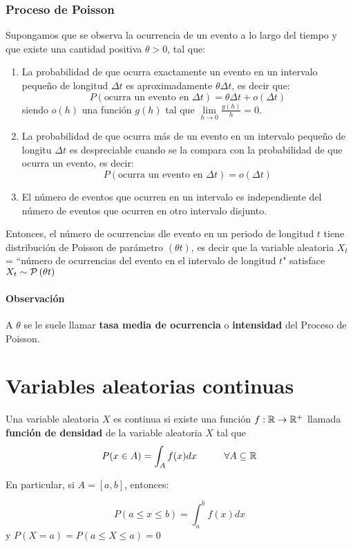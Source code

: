 \subsubsection{Proceso de Poisson}
Supongamos que se observa la ocurrencia de un evento a lo largo del tiempo y que existe una cantidad positiva $\theta > 0$, tal que:
\begin{enumerate}
\item La probabilidad de que ocurra exactamente un evento en un intervalo pequeño de longitud $\Delta t$ es aproximadamente $\theta\Delta t$, es decir que:
$$P(\text{ocurra un evento en }\Delta t) = \theta\Delta t + o(\Delta t)$$
siendo $o(h)$ una función $g(h)$ tal que $\lim\limits_{h\to 0}\frac{g(h)}{h} = 0$.
\item La probabilidad de que ocurra más de un evento en un intervalo pequeño de longitu $\Delta t$ es despreciable cuando se la compara con la probabilidad de que ocurra un evento, es decir:
$$P(\text{ocurra un evento en }\Delta t) =  o(\Delta t)$$
\item El número de eventos que ocurren en un intervalo es independiente del número de eventos que ocurren en otro intervalo disjunto.
\end{enumerate}

Entonces, el número de ocurrencias dle evento en un periodo de longitud $t$ tiene distribución de Poisson de parámetro $(\theta t)$, es decir que la variable aleatoria $X_t$ = ``número de ocurrencias del evento en el intervalo de longitud $t$" satisface $X_t\sim \mathcal{P}\left(\theta t\right)$

\paragraph{Observación} A $\theta$ se le suele llamar \textbf{tasa media de ocurrencia} o \textbf{intensidad} del Proceso de Poisson.

\section{Variables aleatorias continuas}
Una variable aleatoria $X$ es continua si existe una función $f:\mathbb{R}\to\mathbb{R}^+$ llamada \textbf{función de densidad} de la variable aleatoria $X$ tal que
$$P(x\in A) = \int_A f(x)dx \hspace*{1cm} \forall A\subseteq\mathbb{R}$$

En particular, si $A=[a,b]$, entonces:

$$P(a\leq x\leq b) = \int_a^b f(x)dx$$ y $P(X=a) = P(a\leq X \leq a)= 0$

